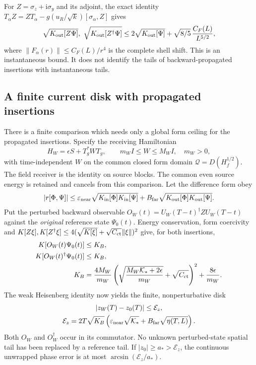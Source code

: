 \documentclass[10pt,twocolumn,letterpaper]{article}
\begin{document}
For $Z=\sigma_z+\mathrm{i}\sigma_y$ and its adjoint, the exact identity
$T_\alpha Z=ZT_\alpha-g(u_R/\sqrt{k})[\sigma_\alpha,Z]$ gives
\[
 \sqrt{K_{\rm out}[Z\Psi]},\ 
 \sqrt{K_{\rm out}[Z^\dagger\Psi]}
 \le2\sqrt{K_{\rm out}[\Psi]}
       +\sqrt{8/5}\,\frac{C_F(L)}{L^{5/2}},
\]
where $\|F_\alpha(r)\|\le C_F(L)/r^4$ is the complete shell shift.
This is an instantaneous bound.  It does not identify the tails of
backward-propagated insertions with instantaneous tails.

\subsection{A finite current disk with propagated insertions}
There is a finite comparison which needs only a global form ceiling for
the propagated insertions.  Specify the receiving Hamiltonian
\[
 H_W=\epsilon S+T_g^*WT_g,\qquad
 m_W I\le W\le M_W I,\quad m_W>0,
\]
with time-independent $W$ on the common closed form domain
$\mathcal Q=D(H_f^{1/2})$. The field receiver is the identity on source
blocks. The common even source energy is
retained and cancels from this comparison.  Let the difference form obey
\[
 |r[\Phi,\Psi]|\le\varepsilon_{\rm near}
       \sqrt{K_{\rm in}[\Phi]K_{\rm in}[\Psi]}
       +B_{\rm far}\sqrt{K_{\rm out}[\Phi]K_{\rm out}[\Psi]}.
\]
Put the perturbed backward observable
$O_W(t)=U_W(T-t)^\dagger ZU_W(T-t)$ against the \emph{original}
reference state $\Psi_0(t)$.  Energy conservation, form coercivity and
$K[Z\xi],K[Z^\dagger\xi]\le4(\sqrt{K[\xi]}+\sqrt{C_{\rm ct}}\|\xi\|)^2$
give, for both insertions,
\[
 \begin{split}
 K[O_W(t)\Psi_0(t)]&\le K_B,\\
 K[O_W(t)^\dagger\Psi_0(t)]&\le K_B,\\
 K_B&=\frac{4M_W}{m_W}
  \left(\sqrt{\frac{M_W\mathcal K_*+2\epsilon}{m_W}}+\sqrt{C_{\rm ct}}\right)^2
       +\frac{8\epsilon}{m_W}.
 \end{split}
\]
The weak Heisenberg identity now yields the finite, nonperturbative disk
\[
 \begin{gathered}
 |z_W(T)-z_0(T)|\le\mathcal E_z,\\
 \mathcal E_z=2T\sqrt{K_B}\left(
    \varepsilon_{\rm near}\sqrt{\mathcal K_*}
       +B_{\rm far}\sqrt{\eta(T,L)}\right).
 \end{gathered}
\]
Both $O_W$ and $O_W^\dagger$ occur in its commutator.  No unknown
perturbed-state spatial tail has been replaced by a reference tail.
If $|z_0|\ge a_*>\mathcal E_z$, the continuous unwrapped phase error is
at most $\arcsin(\mathcal E_z/a_*)$.
\end{document}
